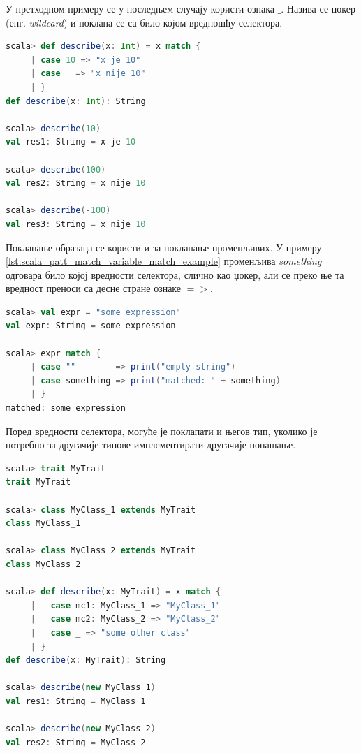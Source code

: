 \documentclass[12pt,oneside]{memoir}
\begin{document}
У претходном примеру се у последњем случају користи ознака $\_$. Назива се џокер (енг. \textit{wildcard}) и поклапа се са било којом вредношћу селектора.

\begin{lstlisting}[language=Scala, caption={Џокер у поклапању образаца}, label={lst:scala_patt_match_wildcard}]
scala> def describe(x: Int) = x match {
     | case 10 => "x je 10"
     | case _ => "x nije 10"
     | }
def describe(x: Int): String

scala> describe(10)
val res1: String = x je 10

scala> describe(100)
val res2: String = x nije 10

scala> describe(-100)
val res3: String = x nije 10
\end{lstlisting}

Поклапање образаца се користи и за поклапање променљивих. У примеру \ref{lst:scala_patt_match_variable_match_example} променљива \textit{something} одговара било којој вредности селектора, слично као џокер, али се преко ње та вредност преноси са десне стране ознаке $=>$. \cite{scala_prog}

\begin{lstlisting}[language=Scala, caption={Поклапање променљивих}, label={lst:scala_patt_match_variable_match_example}]
scala> val expr = "some expression"
val expr: String = some expression

scala> expr match {
     | case ""        => print("empty string")
     | case something => print("matched: " + something)
     | }
matched: some expression
\end{lstlisting}

Поред вредности селектора, могуће је поклапати и његов тип, уколико је потребно за другачије типове имплементирати другачије понашање.

\begin{lstlisting}[language=Scala, caption={Поклапање типова}, label={lst:scala_patt_match_types_example}]
scala> trait MyTrait
trait MyTrait

scala> class MyClass_1 extends MyTrait
class MyClass_1

scala> class MyClass_2 extends MyTrait
class MyClass_2

scala> def describe(x: MyTrait) = x match {
     |   case mc1: MyClass_1 => "MyClass_1"
     |   case mc2: MyClass_2 => "MyClass_2"
     |   case _ => "some other class"
     | }
def describe(x: MyTrait): String

scala> describe(new MyClass_1)
val res1: String = MyClass_1

scala> describe(new MyClass_2)
val res2: String = MyClass_2
\end{lstlisting}
\end{document}
